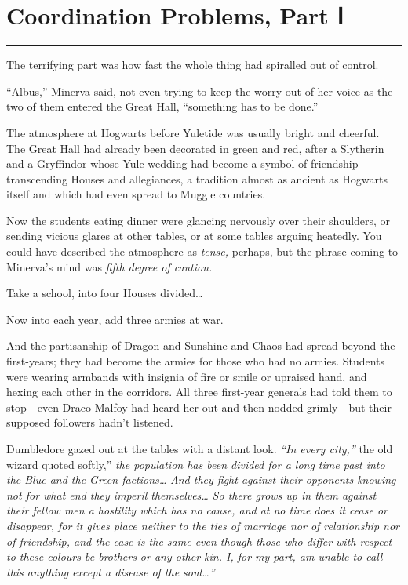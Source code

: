 \chapter{Coordination Problems, Part
Ⅰ}\label{coordination-problems-part}

\begin{center}\rule{3in}{0.4pt}\end{center}

The terrifying part was how fast the whole thing had spiralled out of
control.

``Albus,'' Minerva said, not even trying to keep the worry out of her
voice as the two of them entered the Great Hall, ``something has to be
done.''

The atmosphere at Hogwarts before Yuletide was usually bright and
cheerful. The Great Hall had already been decorated in green and red,
after a Slytherin and a Gryffindor whose Yule wedding had become a
symbol of friendship transcending Houses and allegiances, a tradition
almost as ancient as Hogwarts itself and which had even spread to Muggle
countries.

Now the students eating dinner were glancing nervously over their
shoulders, or sending vicious glares at other tables, or at some tables
arguing heatedly. You could have described the atmosphere as
\emph{tense,} perhaps, but the phrase coming to Minerva's mind was
\emph{fifth degree of caution.}

Take a school, into four Houses divided\ldots{}

Now into each year, add three armies at war.

And the partisanship of Dragon and Sunshine and Chaos had spread beyond
the first-years; they had become the armies for those who had no armies.
Students were wearing armbands with insignia of fire or smile or
upraised hand, and hexing each other in the corridors. All three
first-year generals had told them to stop---even Draco Malfoy had heard
her out and then nodded grimly---but their supposed followers hadn't
listened.

Dumbledore gazed out at the tables with a distant look. \emph{``In every
city,''} the old wizard quoted softly,'' \emph{the population has been
divided for a long time past into the Blue and the Green
factions\ldots{}} \emph{And they fight against their opponents knowing
not for what end they imperil themselves\ldots{}} \emph{So there grows
up in them against their fellow men a hostility which has no cause, and
at no time does it cease or disappear, for it gives place neither to the
ties of marriage nor of relationship nor of friendship, and the case is
the same even though those who differ with respect to these colours be
brothers or any other kin. I, for my part, am unable to call this
anything except a disease of the soul\ldots{}''}

